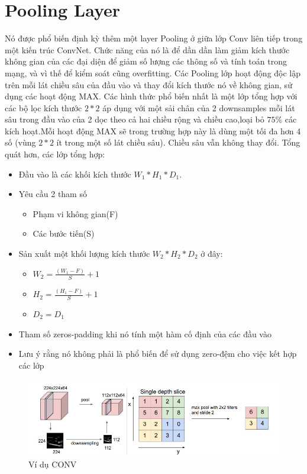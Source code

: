 \documentclass[a4paper,12pt]{report}
\begin{document}
\section{Pooling Layer}
Nó được phổ biến định kỳ thêm một layer Pooling ở giữa lớp Conv liên tiếp trong một kiến trúc ConvNet. Chức năng của nó là để dần dần làm giảm kích thước không gian của các đại diện để giảm số lượng các thông số và tính toán trong mạng, và vì thế để kiểm soát cũng overfitting. Các Pooling lớp hoạt động độc lập trên mỗi lát chiều sâu của đầu vào và thay đổi kích thước nó về không gian, sử dụng các hoạt động MAX. Các hình thức phổ biến nhất là một lớp tổng hợp với các bộ lọc kích thước $2*2$ áp dụng với một sải chân của 2 downsamples mỗi lát sâu trong đầu vào của 2 dọc theo cả hai chiều rộng và chiều cao,loại bỏ $75\%$ các kích hoạt.Mỗi hoạt động MAX sẽ trong trường hợp này là dùng một tối đa hơn 4 số (vùng $2*2$ ít trong một số lát chiều sâu). Chiều sâu vẫn không thay đổi. Tổng quát hơn, các lớp tổng hợp:
\begin{itemize}
\item Đầu vào là các khối kích thước $W_1*H_1*D_1$.
\item Yêu cầu 2 tham số
\begin{itemize}
\item Phạm vi không gian(F)
\item Các bước tiến(S)
\end{itemize}
\item Sản xuất một khối lượng kích thước $W_2*H_2*D_2$ ở đây:
\begin{itemize}
\item $W_2 =\frac{(W_1 - F)}{S} + 1$
\item $H_2 =\frac{(H_1 - F)}{S} + 1$
\item $D_2 = D_1$
\end{itemize}
\item Tham số zeros-padding khi nó tính một hàm cố định của các đầu vào
\item Lưu ý rằng nó không phải là phổ biến để sử dụng zero-đệm cho việc kết hợp các lớp
\end{itemize}
\begin{center}
\begin{figure}[H]
\includegraphics[scale=0.8]{img4.png}
\caption{Ví dụ CONV}
\end{figure}
\end{center}
\end{document}
